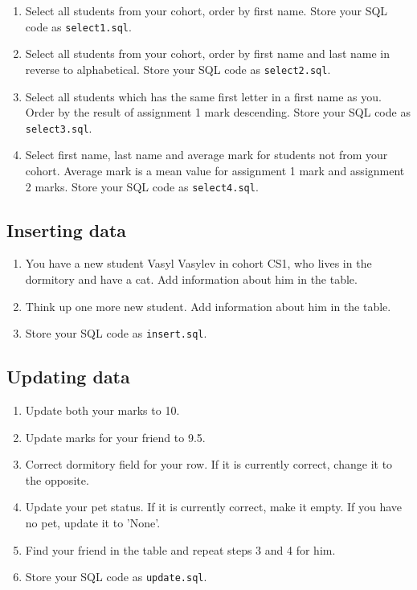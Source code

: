 \documentclass[12pt]{article}
\newcommand{\code}[1]{\texttt{#1}}
\begin{document}
\begin{enumerate}
\item Select all students from your cohort, order by first name. Store your SQL code as \code{select1.sql}.

\item Select all students from your cohort, order by first name and last name  in reverse to alphabetical. Store your SQL code as \code{select2.sql}.

\item Select all students which has the same first letter in a first name as you. Order by the result of assignment 1 mark descending. Store your SQL code as \code{select3.sql}.

\item Select first name, last name and average mark for students not from your cohort. Average mark is a mean value for assignment 1 mark and assignment 2 marks. Store your SQL code as \code{select4.sql}.

\end{enumerate}

\subsection*{Inserting data}

\begin{enumerate}

\item You have a new student Vasyl Vasylev in cohort CS1, who lives in the dormitory and have a cat. Add information about him in the table.

\item Think up one more new student. Add information about him in the table.

\item Store your SQL code as \code{insert.sql}.

\end{enumerate}

\subsection*{Updating data}

\begin{enumerate}

\item Update both your marks to 10.

\item Update marks for your friend to 9.5.

\item Correct dormitory field for your row. If it is currently correct, change it to the opposite.

\item Update your pet status. If it is currently correct, make it empty. If you have no pet, update it to 'None'.

\item Find your friend in the table and repeat steps 3 and 4 for him.

\item Store your SQL code as \code{update.sql}.

\end{enumerate}
\end{document}
